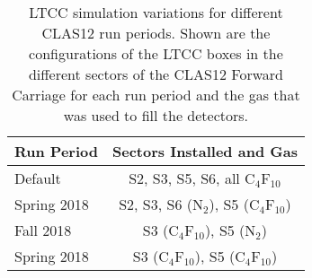 \begin{table}
	\begin{center}
		\begin{tabular}{| l | c |}
			\hline \hline
			Run Period       & Sectors Installed and Gas \\
			\hline
			Default          & S2, S3, S5, S6, all C$_4$F$_{10}$    \\
			Spring 2018  & S2, S3, S6 (N$_2$), S5 (C$_4$F$_{10}$)  \\
			Fall 2018    & S3 (C$_4$F$_{10}$), S5 (N$_2$)          \\
			Spring 2018  & S3 (C$_4$F$_{10}$), S5 (C$_4$F$_{10}$) \\
			\hline \hline
		\end{tabular}
	\end{center}
	\caption{LTCC simulation variations for different CLAS12 run periods. Shown are the configurations of the
          LTCC boxes in the different sectors of the CLAS12 Forward Carriage for each run period and the gas that
          was used to fill the detectors.}
	\label{tab:simVariations}
\end{table}
